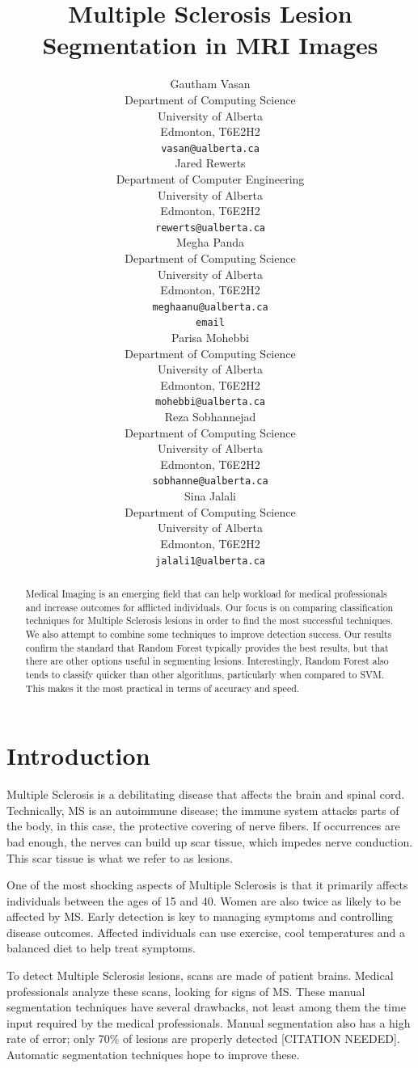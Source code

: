 \documentclass{article} %
\title{Multiple Sclerosis Lesion Segmentation in MRI Images }
\author{
Gautham Vasan \\
Department of Computing Science\\
University of Alberta\\
Edmonton, T6E2H2 \\
\texttt{vasan@ualberta.ca} \\
\And
Jared Rewerts \\
Department of Computer Engineering \\
University of Alberta \\Edmonton, T6E2H2 \\
\texttt{rewerts@ualberta.ca} \\
\And
Megha Panda \\
Department of Computing Science\\
University of Alberta \\Edmonton, T6E2H2 \\
\texttt{meghaanu@ualberta.ca} \\
\texttt{email} \\
\And
Parisa Mohebbi \\
Department of Computing Science \\
University of Alberta \\Edmonton, T6E2H2 \\
\texttt{mohebbi@ualberta.ca} \\
\And
Reza Sobhannejad \\
Department of Computing Science \\
University of Alberta \\Edmonton, T6E2H2 \\
\texttt{sobhanne@ualberta.ca} \\
\And
Sina Jalali  \\
Department of Computing Science \\
University of Alberta \\Edmonton, T6E2H2 \\
\texttt{jalali1@ualberta.ca} \\
}
\begin{document}
\maketitle
\begin{abstract}
Medical Imaging is an emerging field that can help workload for medical professionals and increase outcomes for afflicted individuals. Our focus is on comparing classification techniques for Multiple Sclerosis lesions in order to find the most successful techniques. We also attempt to combine some techniques to improve detection success. Our results confirm the standard that Random Forest typically provides the best results, but that there are other options useful in segmenting lesions. Interestingly, Random Forest also tends to classify quicker than other algorithms, particularly when compared to SVM. This makes it the most practical in terms of accuracy and speed. 
\end{abstract}

\section{Introduction}
Multiple Sclerosis is a debilitating disease that affects the brain and spinal cord. Technically, MS is an autoimmune disease; the immune system attacks parts of the body, in this case, the protective covering of nerve fibers. If occurrences are bad enough, the nerves can build up scar tissue, which impedes nerve conduction. This scar tissue is what we refer to as lesions.

One of the most shocking aspects of Multiple Sclerosis is that it primarily affects individuals between the ages of 15 and 40. Women are also twice as likely to be affected by MS. Early detection is key to managing symptoms and controlling disease outcomes. Affected individuals can use exercise, cool temperatures and a balanced diet to help treat symptoms.

To detect Multiple Sclerosis lesions, scans are made of patient brains. Medical professionals analyze these scans, looking for signs of MS. These manual segmentation techniques have several drawbacks, not least among them the time input required by the medical professionals. Manual segmentation also has a high rate of error; only 70\% of lesions are properly detected [CITATION NEEDED]. Automatic segmentation techniques hope to improve these. 
\end{document}
